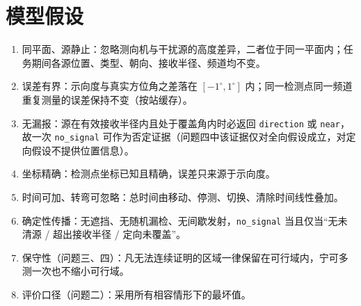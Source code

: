 \documentclass[12pt,a4paper]{article}
\begin{document}
\section{模型假设}
\begin{enumerate}
\item 同平面、源静止：忽略测向机与干扰源的高度差异，二者位于同一平面内；任务期间各源位置、类型、朝向、接收半径、频道均不变。
\item 误差有界：示向度与真实方位角之差落在 $[-1^{\circ},1^{\circ}]$ 内；同一检测点同一频道重复测量的误差保持不变（按站缓存）。
\item 无漏报：源在有效接收半径内且处于覆盖角内时必返回 \texttt{direction} 或 \texttt{near}，故一次 \texttt{no\_signal} 可作为否定证据（问题四中该证据仅对全向假设成立，对定向假设不提供位置信息）。
\item 坐标精确：检测点坐标已知且精确，误差只来源于示向度。
\item 时间可加、转弯可忽略：总时间由移动、停测、切换、清除时间线性叠加。
\item 确定性传播：无遮挡、无随机漏检、无间歇发射，\texttt{no\_signal} 当且仅当“无未清源 / 超出接收半径 / 定向未覆盖”。
\item 保守性（问题三、四）：凡无法连续证明的区域一律保留在可行域内，宁可多测一次也不缩小可行域。
\item 评价口径（问题二）：采用所有相容情形下的最坏值。
\end{enumerate}
\end{document}
